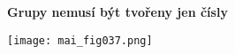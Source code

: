 \wikitextrule
\begin{example}\label{mai:exam051}
  \textbf{Grupy nemusí být tvořeny jen čísly}\newline\small
  {\centering
    \captionsetup{type=figure}
    \texttt{[image: mai\_fig037.png]}
    \par}
  \normalsize
\end{example}